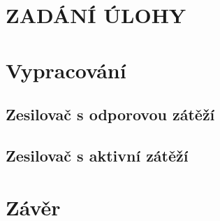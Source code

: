 \documentclass{protokol}
\begin{document}
	\maketitle

\section*{ZADÁNÍ ÚLOHY}
  
\setcounter{section}{0}

\newpage
\section{Vypracování}
  \subsection{Zesilovač s odporovou zátěží} 
  

  \newpage
  \clearpage

  \subsection{Zesilovač s aktivní zátěží} 
  

\section{Závěr}
  

\end{document}
